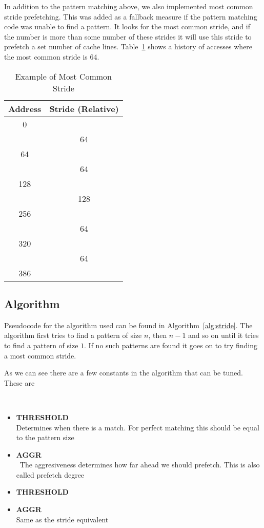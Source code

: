 In addition to the pattern matching above, we also implemented most common stride
prefetching. This was added as a fallback measure if the pattern matching code
was unable to find a pattern.
It looks for the most common stride, and if the number
is more than some number
of these strides it will use this stride to prefetch a
set number of cache lines.
Table~\ref{table:mcs} shows a history of accesses
where the most common stride is 64.
\begin{table}
	\caption{Example of Most Common Stride}
	\centering
	\label{table:mcs}
	\begin{tabular}{c|c}
		\bfseries Address & \bfseries Stride (Relative)\\
		\hline
		0   & \\
		    & 64\\
		64  & \\
		    & 64\\
		128 & \\
		    & 128\\
		256 & \\
		    & 64\\
		320 & \\
		    & 64\\
		386 & \\
	\end{tabular}
\end{table}

\subsection{Algorithm}

Pseudocode for the algorithm used can be found in Algorithm~\ref{alg:stride}.
The algorithm first tries to find a pattern of size $n$, then $n-1$ and so
on until it tries to find a pattern of size $1$. If no such patterns are
found it goes on to try finding a most common stride.

As we can see there are a few constants in the algorithm that can be
tuned. These are

~
\begin{itemize}
	\item \textbf{ THRESHOLD} \\ Determines when there is a match.
	For perfect matching this should be equal to the pattern size \\
	\item \textbf{ AGGR} \\ The aggresiveness determines how far
	ahead we should prefetch. This is also called prefetch degree \\
	\item \textbf{ THRESHOLD} \\
	\item \textbf{ AGGR} \\  Same as the stride equivalent \\
\end{itemize}

